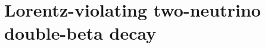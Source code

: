 \begin{table}
  \centering
  \caption{%
    A compilation of the current limits on Majoron-emitting \onbb\ modes as set by the
    \gerda, EXO-200, KamLAND-Zen and NEMO-3 experiments for different isotopes. The most
    stringent limit on the coupling constant $g_\alpha$ is reported, as calculated from
    phase-space factors and nuclear matrix elements reported in
    \cref{tab:nbb:0nbbx-psf-nme}.
  }\label{tab:nbb:0nbbx-lim}
  
\end{table}

\section{Lorentz-violating two-neutrino double-beta decay}%
\label{sec:nbb:2nbbLV}

